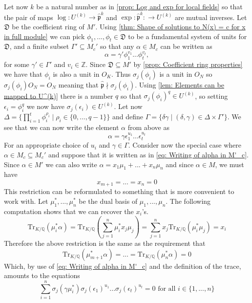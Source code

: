 \documentclass{article}
\newcommand{\mfrak}[1]{\mathfrak{#1}}
\newcommand{\mbb}[1]{\mathbb{#1}}
\newcommand{\tr}{\text{Tr}}
\begin{document}
Let now $k$ be a natural number as in \cref{prop: Log and exp for local fields} so that the pair of maps $\log : U^{(k)} \to \hat {\mfrak p}^k$ 
and $\exp : \hat {\mfrak p}^k : \to U^{(k)}$ are mutual inverses. Let $\mfrak D$ be the coefficient ring of $M'$. Using \cref{thm: Shape of solutions to N(x) = c for x in full module} we can pick $\phi_1, ..., \phi_t \in \mfrak D$ to be a fundamental system of units for $\mfrak D$, and a finite subset $\Gamma' \subseteq M_c'$ so that any $\alpha \in M_c$ can be written as
$$\alpha = \gamma' \phi_1^{v_1} ... \phi_t^{v_t},$$
for some $\gamma' \in \Gamma'$ and $v_i \in \mbb Z$. Since $\mfrak D \subseteq M'$ by \cref{prop: Coefficient ring properties} we have that $\phi_i$ is also a unit in $O_K$. Thus $\sigma_j(\phi_i)$ is a unit in $O_N$ so $\sigma_j(\phi_i) O_N = O_N$ meaning that $\hat {\mfrak p} \nmid \sigma_j(\phi_i)$. Using \cref{lem: Elements can be mapped to U^(k)} there is a number $q$ so that $\sigma_j(\phi_i)^q \in U^{(k)}$, so setting $\epsilon_i = \phi_i^q$ we now have $\sigma_j(\epsilon_i) \in U^{(k)}$. Let now $\Delta = \{\prod_{i = 1}^t \phi_i^{\rho_i} \mid \rho_i \in \{0, ..., q-1 \} \}$ and define $\Gamma = \{\delta \gamma \mid (\delta, \gamma) \in \Delta \times \Gamma' \}$. We see that we can now write the element $\alpha$ from above as
\begin{equation}\label{eq: Writing of alpha in M'_c}
    \alpha = \gamma \epsilon_1^{u_1} ... \epsilon_t^{u_t}
\end{equation}
For an appropriate choice of $u_i$ and $\gamma \in \Gamma$. Consider now the special case where $\alpha \in M_c \subseteq M_c'$ and suppose that it is written as in \cref{eq: Writing of alpha in M'_c}. Since $\alpha \in M'$ we can also write 
$\alpha = x_1 \mu_1 + ... + x_n \mu_n$ and since $\alpha \in M$, we must have 
$$x_{m+1} = ... = x_n = 0$$ 
This restriction can be reformulated to something that is more convenient to work with. Let $\mu_1^*, ..., \mu_n^*$ be the dual basis of $\mu_1, ..., \mu_n$. The following computation shows that we can recover the $x_i$'s. 
$$\tr_{K/\mbb Q}(\mu_i^* \alpha) = \tr_{K/\mbb Q} (\sum_{j=1}^n \mu_i^* x_j \mu_j) = \sum_{j=1}^n x_j \tr_{K/\mbb Q}(\mu_i^* \mu_j) = x_i$$ 
Therefore the above restriction is the same as the requirement that
$$\tr_{K/\mbb Q}(\mu_{m+1}^* \alpha) = ... = \tr_{K/\mbb Q}(\mu_n^* \alpha) = 0$$
Which, by use of \cref{eq: Writing of alpha in M'_c} and the definition of the trace, amounts to the equations
\begin{equation}\label{eq: Restriction of variables using trace}
    \sum_{i = 1}^n \sigma_j(\gamma \mu_i^* ) \sigma_j(\epsilon_1)^{u_1}...\sigma_j(\epsilon_t)^{u_t} = 0 \text{ for all } i \in \{1, ..., n\} 
\end{equation}
\end{document}
